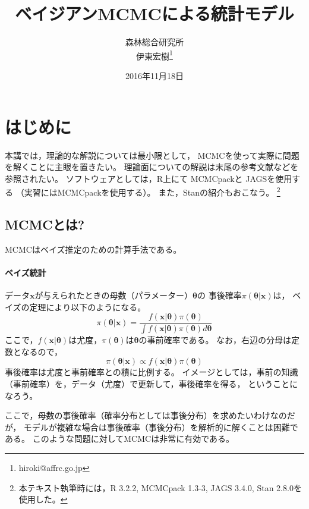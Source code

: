 \documentclass[11pt,uplatex]{jsarticle}
\begin{document}
\title{ベイジアンMCMCによる統計モデル}
\author{森林総合研究所\\伊東宏樹\footnote{hiroki@affrc.go.jp}}
\date{2016年11月18日}
\maketitle


\section{はじめに}

本講では，理論的な解説については最小限として，
MCMCを使って実際に問題を解くことに主眼を置きたい。
理論面についての解説は末尾の参考文献などを参照されたい。
ソフトウェアとしては，\textsf{R}\cite{R}上にて
\textsf{MCMCpack}\cite{MCMCpack}と
\textsf{JAGS}\cite{JAGS}を使用する
（実習には\textsf{MCMCpack}を使用する）。
また，\textsf{Stan}\cite{Stan}の紹介もおこなう。
\footnote{本テキスト執筆時には，R 3.2.2, MCMCpack 1.3-3, JAGS 3.4.0, Stan 2.8.0を使用した。}

\subsection{MCMCとは?}

MCMCはベイズ推定のための計算手法である。

\paragraph{ベイズ統計}

データ$\bm{x}$が与えられたときの母数（パラメーター）$\bm{\theta}$の
事後確率$\pi(\bm{\theta}|\bm{x})$は，
ベイズの定理により以下のようになる。
\begin{equation}
\pi(\bm{\theta}|\bm{x}) = \frac{f(\bm{x}|\bm{\theta})\pi(\bm{\theta})}
{\int{f(\bm{x}|\bm{\theta})\pi(\bm{\theta})d\bm{\theta}}}\label{bayes1}
\end{equation}
ここで，$f(\bm{x}|\bm{\theta})$は尤度，$\pi(\bm{\theta})$は$\bm{\theta}$の事前確率である。
なお，右辺の分母は定数となるので，
\begin{equation}
\pi(\bm{\theta}|\bm{x}) \propto f(\bm{x}|\bm{\theta})\pi(\bm{\theta})\label{bayes2}
\end{equation}
事後確率は尤度と事前確率との積に比例する。
イメージとしては，事前の知識（事前確率）を，データ（尤度）で更新して，事後確率を得る，
ということになろう。

ここで，母数の事後確率（確率分布としては事後分布）を求めたいわけなのだが，
モデルが複雑な場合は事後確率（事後分布）を解析的に解くことは困難である。
このような問題に対してMCMCは非常に有効である。
\end{document}
